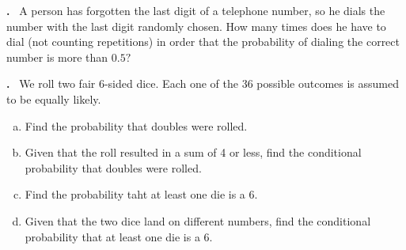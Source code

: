 \documentclass[11pt]{article}
\newcounter{problem}
\newcounter{solution}
\newcommand\Problem{%
  \stepcounter{problem}%
  \textbf{\theproblem.}~%
  \setcounter{solution}{0}%
}
\begin{document}
\Problem{} A person has forgotten the last digit of a telephone number, so he dials
  the number with the last digit randomly chosen. How many times does he have to
  dial (not counting repetitions) in order that the probability of dialing the
  correct number is more than $0.5?$
  
\Problem{} We roll two fair 6-sided dice. Each one of the 36 possible outcomes is
  assumed to be equally likely. 

\begin{enumerate}[(a)]
  \item Find the probability that doubles were rolled.
  \item Given that the roll resulted in a sum of 4 or less, find the conditional
    probability that doubles were rolled.
  \item Find the probability taht at least one die is a 6.
  \item Given that the two dice land on different numbers, find the conditional
    probability that at least one die is a 6.
\end{enumerate}
\end{document}
